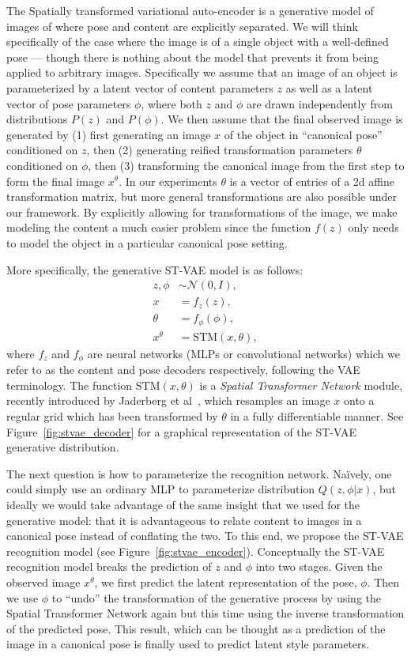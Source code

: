 The Spatially transformed variational auto-encoder is a generative model of images of where pose and content are explicitly separated.  
We will think specifically of the case where the image is of a single object with a well-defined pose --- though there is nothing about the model
that prevents it from being applied to arbitrary images.
Specifically we assume that an image of an object is parameterized by a latent vector of content parameters 
$z$ as well as a latent vector of pose parameters $\phi$,
where both $z$ and $\phi$ are drawn independently from distributions $P(z)$ and $P(\phi)$.  
We then assume that the final observed image is generated by (1) first generating an image $x$ of the object in ``canonical pose'' conditioned on $z$,
then (2) generating reified transformation parameters $\theta$ conditioned on $\phi$, then (3) transforming the canonical image from the first step to form the 
final image $x^\theta$.  In our experiments $\theta$ is a vector of entries of a 2d affine transformation matrix, but more general transformations are also possible under our
framework.  
By explicitly allowing for  transformations of the image, we make modeling the content a much easier problem since the function $f(z)$ only needs to 
model the object in a particular canonical pose setting.

More specifically, the generative ST-VAE model is as follows:
\begin{align*}
z,\phi &\sim \mathcal{N}(0, I), \\
x &= f_z (z), \\
\theta &= f_\phi (\phi), \\
x^\theta &= \mbox{STM}(x, \theta),
\end{align*}
where $f_z$ and $f_\phi$ are neural networks (MLPs or convolutional networks) which we
refer to as  the content and pose decoders respectively, following the VAE terminology.
The function $\mbox{STM}(x, \theta)$ is a \emph{Spatial Transformer Network} module, recently introduced by Jaderberg et al~\cite{jaderberg2015spatial},
which resamples an image $x$ onto a regular grid which has been transformed by $\theta$ in a fully differentiable manner.
See Figure~\ref{fig:stvae_decoder} for a graphical representation of the ST-VAE generative distribution.

The next question is how to parameterize the recognition network.  Na\"{i}vely, one could 
simply use an ordinary MLP to parameterize distribution $Q(z, \phi | x)$, but ideally we would take advantage of the same
 insight that we used for the generative model: that it is advantageous to relate content to images in a canonical pose instead
 of conflating the two.  To this end, we propose the ST-VAE recognition model (see Figure~\ref{fig:stvae_encoder}). 
Conceptually the ST-VAE recognition model breaks the prediction of $z$ and $\phi$ into two stages.  Given the observed image $x^\theta$,
we first predict the latent representation of the pose, $\phi$.  Then we use $\phi$ to ``undo'' the transformation of the generative process
by using the Spatial Transformer Network again but this time using the inverse transformation of the predicted pose.  This result, which can be
thought as a prediction of the image in a canonical pose is finally used to predict latent style parameters.

